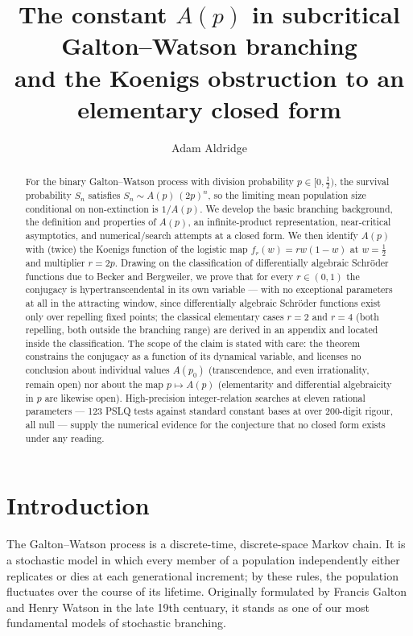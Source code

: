 \documentclass[11pt,a4paper]{article}
\title{\textbf{The constant $A(p)$ in subcritical Galton--Watson branching}\\[0.4em]
\large and the Koenigs obstruction to an elementary closed form}
\author{Adam Aldridge}
\date{}
\theoremstyle{plain}
\theoremstyle{definition}
\begin{document}
\maketitle

\begin{abstract}
\noindent
For the binary Galton--Watson process with division probability $p\in[0,\tfrac12)$, the survival probability $S_n$ satisfies $S_n\sim A(p)\,(2p)^n$, so the limiting mean population size conditional on non-extinction is $1/A(p)$. We develop the basic branching background, the definition and properties of $A(p)$, an infinite-product representation, near-critical asymptotics, and numerical/search attempts at a closed form. We then identify $A(p)$ with (twice) the Koenigs function of the logistic map $f_r(w)=rw(1-w)$ at $w=\tfrac12$ and multiplier $r=2p$. Drawing on the classification of differentially algebraic Schr\"oder functions due to Becker and Bergweiler, we prove that for every $r\in(0,1)$ the conjugacy is hypertranscendental in its own variable --- with no exceptional parameters at all in the attracting window, since differentially algebraic Schr\"oder functions exist only over repelling fixed points; the classical elementary cases $r=2$ and $r=4$ (both repelling, both outside the branching range) are derived in an appendix and located inside the classification. The scope of the claim is stated with care: the theorem constrains the conjugacy as a function of its dynamical variable, and licenses no conclusion about individual values $A(p_0)$ (transcendence, and even irrationality, remain open) nor about the map $p\mapsto A(p)$ (elementarity and differential algebraicity in $p$ are likewise open). High-precision integer-relation searches at eleven rational parameters --- 123 PSLQ tests against standard constant bases at over 200-digit rigour, all null --- supply the numerical evidence for the conjecture that no closed form exists under any reading.
\end{abstract}

\tableofcontents
\clearpage

\section{Introduction}

The Galton--Watson process is a discrete-time, discrete-space Markov chain.
It is a stochastic model in which every member of a population independently
either replicates or dies at each generational increment; by these rules, the population
fluctuates over the course of its lifetime. Originally formulated by
Francis Galton and Henry Watson in the late 19th centuary, it stands as one of our most 
fundamental models of stochastic branching. 
\end{document}
